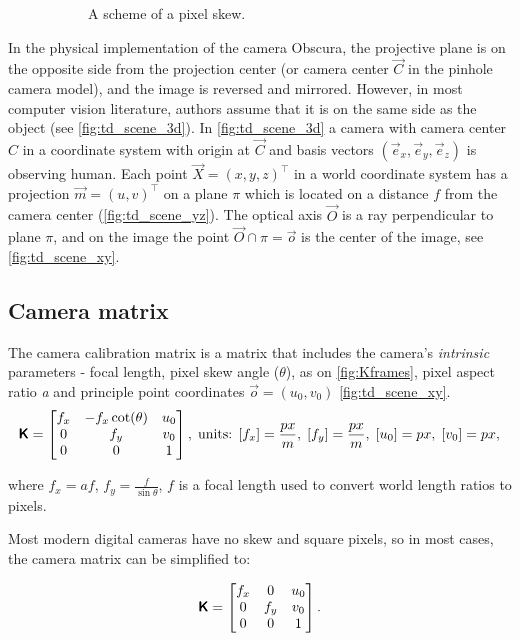 \begin{figure}[ht]
\begin{subfigure}[b]{0.49\textwidth}
      \caption{A scheme of a pixel skew.}
      \label{fig:Kframes}
    \end{subfigure}
    \caption{}
\end{figure}

In the physical implementation of the camera Obscura, the projective plane is on the opposite side from the projection center (or camera center $\vec{C}$ in the pinhole camera model), and the image is reversed and mirrored. 
However, in most computer vision literature, authors assume that it is on the same side as the object (see \autoref{fig:td_scene_3d}).
In \autoref{fig:td_scene_3d} a camera with camera center $C$ in a coordinate system with origin at $\vec{C}$ and basis vectors $(\vec{e}_x, \vec{e}_y, \vec{e}_z)$ is observing human. 
Each point $\vec{X} = (x, y, z)^\top$ in a world coordinate system has a projection $\vec{m} = (u, v)^\top$ on a plane $\pi$ which is located on a distance $f$ from the camera center (\autoref{fig:td_scene_yz}). 
The optical axis $\vec{O}$ is a ray perpendicular to plane $\pi$, and on the image the point $ \vec{O} \cap \pi = \vec{o}$ is the center of the image, see \autoref{fig:td_scene_xy}.

\subsection{Camera matrix}
The camera calibration matrix is a matrix that includes the camera's \textit{intrinsic} parameters - focal length, pixel skew angle ($\theta$), as on \autoref{fig:Kframes}, pixel aspect ratio \textit{a} and principle point coordinates $\vec{o} = (u_0, v_0)$ \autoref{fig:td_scene_xy}.
\begin{equation}
    \pmb{\mathsf{K}} = \begin{bmatrix}
        f_x & -f_x \cot(\theta) & u_0 \\
        0 & f_y & v_0 \\
        0 & 0 & 1 \\
    \end{bmatrix},
    \textrm{\;units: } [f_x]=\frac{px}{m},\; [f_y]=\frac{px}{m},\; [u_0]=px,\; [v_0]=px,
\end{equation}

where $f_x = af$, $f_y = \frac{f}{\sin{\theta}}$, $f$ is a focal length used to convert world length ratios to pixels.

Most modern digital cameras have no skew and square pixels, so in most cases, the camera matrix can be simplified to:

\begin{equation}
    \label{eq:kmat}
    \pmb{\mathsf{K}} = \begin{bmatrix}
        f_x & 0 & u_0 \\
        0 & f_y & v_0 \\
        0 & 0 & 1 \\
    \end{bmatrix}.
\end{equation}

